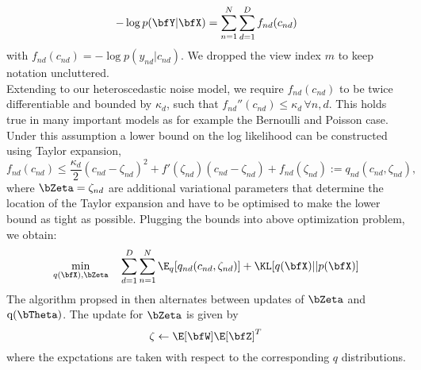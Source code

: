 \begin{equation*}
-\log p(\bfY|\bfX) = \sum_{n=1}^{N} \sum_{d=1}^{D} f_{nd} (c_{nd})
\end{equation*}
with $f_{nd}(c_{nd}) = -\log p(y_{nd}|c_{nd})$. We dropped the view index $m$ to keep notation uncluttered.\\
Extending \cite{seeger} to our heteroscedastic noise model, we require $f_{nd}(c_{nd})$ to be twice differentiable and bounded by $\kappa_d$, such that $f_{nd}''(c_{nd}) \leq \kappa_d \,\forall n,d$. This holds true in many important models as for example the Bernoulli and Poisson case. Under this assumption a lower bound on the log likelihood can be constructed using Taylor expansion,
\begin{equation*}
f_{nd}(c_{nd}) \leq \frac{\kappa_d}{2} (c_{nd} - \zeta_{nd})^2 + f'(\zeta_{nd})(c_{nd} - \zeta_{nd}) + f_{nd}(\zeta_{nd}) := q_{nd}(c_{nd},\zeta_{nd}),
\end{equation*}
where $\bZeta =  \zeta_{nd} $ are additional variational parameters that determine the location of the Taylor expansion and have to be optimised to make the lower bound as tight as possible. Plugging the bounds into above optimization problem, we obtain:
\begin{equation*}
\min_{q(\bfX),\bZeta} \quad \sum_{d=1}^{D}\sum_{n=1}^{N} \E_q [ q_{nd}(c_{nd},\zeta_{nd})] + \KL[q(\bfX)||p(\bfX)]
\end{equation*}
The algorithm propsed in \cite{seeger} then alternates between updates of $\bZeta$ and $\mathrm{q}(\bTheta)$. The update for $\bZeta$ is given by
\begin{equation*}
\zeta \leftarrow \E[\bfW]\E[\bfZ]^{T}
\end{equation*}
where the expctations are taken with respect to the corresponding $q$ distributions.\\
